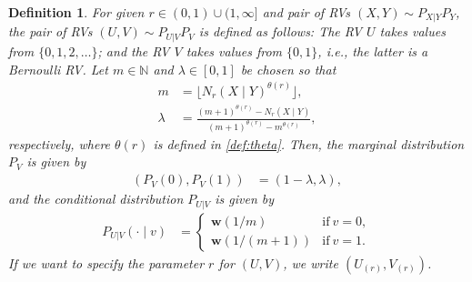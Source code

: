 \documentclass[conference, draftcls, onecolumn]{IEEEtran}
\theoremstyle{plain}
\newtheorem{definition}{Definition}
\newcommand{\bvec}[1]{\boldsymbol{#1}}
\begin{document}
\begin{definition}
\label{def:UV}
For given $r \in (0, 1) \cup (1, \infty]$ and pair of RVs $(X, Y) \sim P_{X|Y} P_{Y}$, the pair of RVs $(U, V) \sim P_{U|V} P_{V}$ is defined as follows:
The RV $U$ takes values from $\{ 0, 1, 2, \dots \}$; and the RV $V$ takes values from $\{ 0, 1 \}$, i.e., the latter is a Bernoulli RV.
Let $m \in \mathbb{N}$ and $\lambda \in [0, 1]$ be chosen so that
\begin{align}
m
& =
\Big\lfloor N_{r}(X \mid Y)^{\theta( r )} \Big\rfloor ,
\label{eq:m_UV} \\
\lambda
& =
\frac{ (m+1)^{\theta( r )} - N_{r}(X \mid Y) }{ (m+1)^{\theta( r )} - m^{\theta( r )} } ,
\label{eq:lambda_UV}
\end{align}
respectively, where $\theta( r )$ is defined in \eqref{def:theta}.
Then, the marginal distribution $P_{V}$ is given by
\begin{align}
( P_{V}( 0 ), P_{V}( 1 ) )
& =
(1 - \lambda, \lambda) ,
\label{def:marginal_V}
\end{align}
and the conditional distribution $P_{U|V}$ is given by
\begin{align}
P_{U|V}(\cdot \mid v)
& =
\begin{cases}
\bvec{w} (1/m)
& \mathrm{if} \ v = 0 ,
\\
\bvec{w} ( 1/(m+1) )
& \mathrm{if} \ v = 1 .
\end{cases}
\label{def:cond_UV}
\end{align}
If we want to specify the parameter $r$ for $(U, V)$, we write $(U_{(r)}, V_{(r)})$.
\end{definition}
\end{document}
